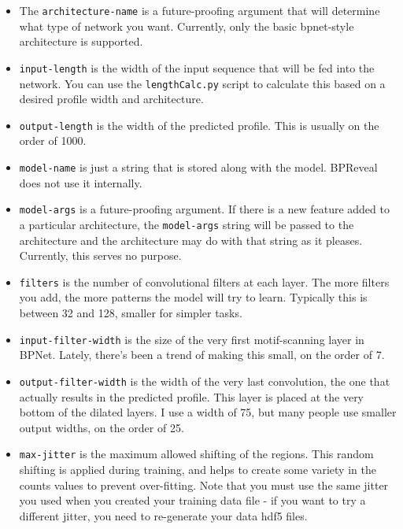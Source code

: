 \documentclass{article}
\begin{document}
\begin{itemize}
    \item The \texttt{architecture-name} is a future-proofing argument that will determine
        what type of network you want. Currently, only the basic bpnet-style architecture
        is supported.
    \item \texttt{input-length} is the width of the input sequence that will be fed into
        the network. You can use the \texttt{lengthCalc.py} script to calculate this based on
        a desired profile width and architecture.
    \item \texttt{output-length} is the width of the predicted profile. This is usually on
        the order of 1000.
    \item \texttt{model-name} is just a string that is stored along with the model.
        BPReveal does not use it internally.
    \item \texttt{model-args} is a future-proofing argument. If there is a new feature added
        to a particular architecture, the \texttt{model-args} string will be passed to the
        architecture and the architecture may do with that string as it pleases.
        Currently, this serves no purpose.
    \item \texttt{filters} is the number of convolutional filters at each layer. The more
        filters you add, the more patterns the model will try to learn. Typically this is
        between 32 and 128, smaller for simpler tasks.
    \item \texttt{input-filter-width} is the size of the very first motif-scanning layer in BPNet.
        Lately, there's been a trend of making this small, on the order of 7.
    \item \texttt{output-filter-width} is the width of the very last convolution, the one that
        actually results in the predicted profile. This layer is placed at the very bottom of
        the dilated layers. I use a width of 75, but many people use smaller output widths,
        on the order of 25.
    \item \texttt{max-jitter} is the maximum allowed shifting of the regions.
        This random shifting is applied during training, and helps to create some variety
        in the counts values to prevent over-fitting. Note that you must use the same
        jitter you used when you created your training data file - if you want to try a
        different jitter, you need to re-generate your data hdf5 files.
\end{itemize}

\newpage
\end{document}
